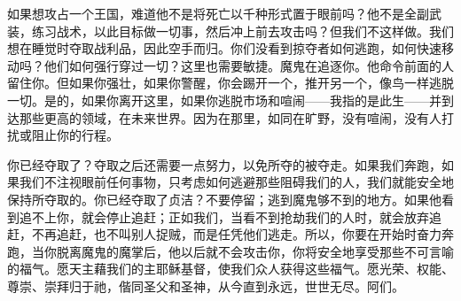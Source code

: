 如果想攻占一个王国，难道他不是将死亡以千种形式置于眼前吗？他不是全副武装，练习战术，以此目标做一切事，然后冲上前去攻击吗？但我们不这样做。我们想在睡觉时夺取战利品，因此空手而归。你们没看到掠夺者如何逃跑，如何快速移动吗？他们如何强行穿过一切？这里也需要敏捷。魔鬼在追逐你。他命令前面的人留住你。但如果你强壮，如果你警醒，你会踢开一个，推开另一个，像鸟一样逃脱一切。是的，如果你离开这里，如果你逃脱市场和喧闹——我指的是此生——并到达那些更高的领域，在未来世界。因为在那里，如同在旷野，没有喧闹，没有人打扰或阻止你的行程。\par

你已经夺取了？夺取之后还需要一点努力，以免所夺的被夺走。如果我们奔跑，如果我们不注视眼前任何事物，只考虑如何逃避那些阻碍我们的人，我们就能安全地保持所夺取的。你已经夺取了贞洁？不要停留；逃到魔鬼够不到的地方。如果他看到追不上你，就会停止追赶；正如我们，当看不到抢劫我们的人时，就会放弃追赶，不再追赶，也不叫别人捉贼，而是任凭他们逃走。所以，你要在开始时奋力奔跑，当你脱离魔鬼的魔掌后，他以后就不会攻击你，你将安全地享受那些不可言喻的福气。愿天主藉我们的主耶稣基督，使我们众人获得这些福气。愿光荣、权能、尊崇、崇拜归于祂，偕同圣父和圣神，从今直到永远，世世无尽。阿们。\par

